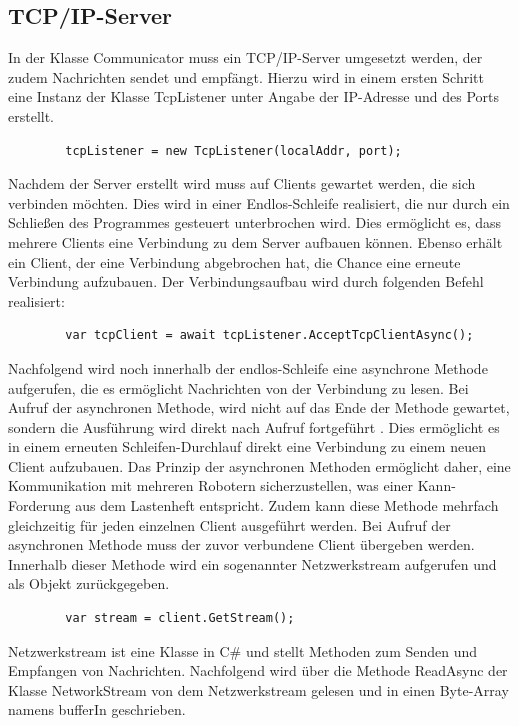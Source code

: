 \documentclass[ a4paper,
                oneside,
                toc=bibliography,
                toc=listof
                ]{scrbook}
\begin{document}
   	\subsection{TCP/IP-Server}
   	In der Klasse Communicator muss ein TCP/IP-Server umgesetzt werden, der zudem Nachrichten sendet und empfängt.
   	Hierzu wird in einem ersten Schritt eine Instanz der Klasse TcpListener unter Angabe der IP-Adresse und des Ports erstellt. \cite{MicrosoftTCP}\\
   	\begin{lstlisting}
   		tcpListener = new TcpListener(localAddr, port);
   	\end{lstlisting}
   	Nachdem der Server erstellt wird muss auf Clients gewartet werden, die sich verbinden möchten. Dies wird in einer Endlos-Schleife realisiert, die nur durch ein Schließen des Programmes gesteuert unterbrochen wird. Dies ermöglicht es, dass mehrere Clients eine Verbindung zu dem Server aufbauen können. Ebenso erhält ein Client, der eine Verbindung abgebrochen hat, die Chance eine erneute Verbindung aufzubauen. Der Verbindungsaufbau wird durch folgenden Befehl realisiert:
   	\begin{lstlisting}
   		var tcpClient = await tcpListener.AcceptTcpClientAsync();
   	\end{lstlisting}
   	Nachfolgend wird noch innerhalb der endlos-Schleife eine asynchrone Methode aufgerufen, die es ermöglicht Nachrichten von der Verbindung zu lesen.
   	Bei Aufruf der asynchronen Methode, wird nicht auf das Ende der Methode gewartet, sondern die Ausführung wird direkt nach Aufruf fortgeführt \cite{kotz2022c}. Dies ermöglicht es in einem erneuten Schleifen-Durchlauf direkt eine Verbindung zu einem neuen Client aufzubauen. Das Prinzip der asynchronen Methoden ermöglicht daher, eine Kommunikation mit mehreren Robotern sicherzustellen, was einer Kann-Forderung aus dem Lastenheft entspricht. Zudem kann diese Methode mehrfach gleichzeitig für jeden einzelnen Client ausgeführt werden. Bei Aufruf der asynchronen Methode muss der zuvor verbundene Client übergeben werden.
   	Innerhalb dieser Methode wird ein sogenannter Netzwerkstream aufgerufen und als Objekt zurückgegeben.
   	\begin{lstlisting}
   		var stream = client.GetStream();
   	\end{lstlisting}
   	Netzwerkstream ist eine Klasse in C\# und stellt Methoden zum Senden und Empfangen von Nachrichten.
   	Nachfolgend wird über die Methode ReadAsync der Klasse NetworkStream von dem Netzwerkstream gelesen und in einen Byte-Array namens bufferIn geschrieben.
\end{document}
